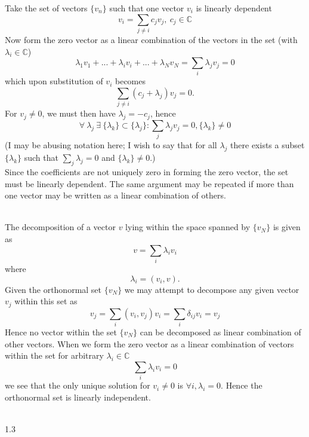 \documentclass[10pt,letterpaper]{article}
\begin{document}
	\benum
	\item 
	Take the set of vectors $\{v_n\}$ such that one vector $v_i$ is linearly dependent
	\[
		v_i = \sum_{j\ne i} c_j v_j,\ c_j \in \mathbb C
	\]
	Now form the zero vector as a linear combination of the vectors in the set (with $\lambda_i \in \mathbb C$)
	\[
		\lambda_1 v_1 + ... + \lambda_i v_i+ ... + \lambda_N v_N = \sum_i \lambda_j v_j  =  0
	\]
	which upon substitution of $v_i$ becomes
	\[
		\sum_{j\ne i} (c_j+\lambda_j)v_j = 0.
	\]
	For $v_j \ne 0$, we must then have $\lambda_j = -c_j$, hence
	\[
		 \forall\  \lambda_j \ \exists\   \{\lambda_k\} \subset \{\lambda_j\}: \sum_{j} \lambda_jv_j = 0, \{\lambda_k\} \ne 0
	\]
	(I may be abusing notation here; I wish to say that for all $\lambda_j$ there exists a subset $\{\lambda_k\}$ 
	such that $\sum_j \lambda_j = 0$ and $\{\lambda_k\}\ne 0$.) \\ 
	Since the coefficients are not uniquely zero in forming the zero vector, the set must be linearly dependent.  The 
	same argument may be repeated if more than one vector may be written as a linear combination of others.
	\\ \\
	\item 
	The decomposition of a vector $v$ lying within the space spanned by $\{v_N\}$ is given as 
	\[
		v = \sum_i \lambda_i v_i
	\]
	where
	\[
		\lambda_i = (v_i,v).
	\]
	Given the orthonormal set $\{v_N\}$ we may attempt to decompose any given vector $v_j$ within this set
	as 
	\[
		v_j = \sum_i (v_i,v_j)v_i = \sum_i \delta_{ij} v_i = v_j
	\]
	Hence no vector within the set $\{v_N\}$ can be decomposed as linear combination of other vectors.
	When we form the zero vector as a linear combination of vectors within the set for arbitrary 
	$\lambda_i \in \mathbb C$ 
	\[
		\sum_i \lambda_i v_i = 0
	\]
	we see that the only unique solution for $v_i\ne 0$ is $\forall i, \lambda_i = 0$. Hence the orthonormal set is linearly 
	independent. \\ \\
	\eenum 
	
	\item[1.3]
	
\end{document}
